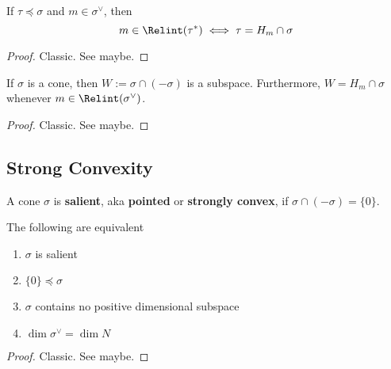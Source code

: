 \begin{lemma}
  \label{1-2-rel-interior-dual-face}

  If $\tau \preceq \sigma$ and $m \in \sigma^\vee$, then
  $$m \in \Relint(\tau^*) \iff \tau = H_m \cap \sigma$$
\end{lemma}
\begin{proof}
  \uses{}

  Classic. See \cite{Oda_1988} maybe.
\end{proof}


\begin{lemma}
  \label{1-2-min-face}

  If $\sigma$ is a cone, then $W := \sigma \cap (-\sigma)$ is a subspace. Furthermore,
  $W = H_m \cap \sigma$ whenever $m \in \Relint(\sigma^\vee)$.
\end{lemma}
\begin{proof}
  \uses{}

  Classic. See \cite{Oda_1988} maybe.
\end{proof}


\subsection{Strong Convexity}


\begin{definition}
  \label{02-salient-cone}
  \uses{}
  \leanok

  A cone $\sigma$ is {\bf salient}, aka {\bf pointed} or {\bf strongly convex}, if $\sigma \cap (-\sigma) = \{0\}$.
\end{definition}


\begin{proposition}
  \label{02-salient-cone-tfae}

  The following are equivalent
  \begin{enumerate}
    \item $\sigma$ is salient
    \item $\{0\} \preceq \sigma$
    \item $\sigma$ contains no positive dimensional subspace
    \item $\dim \sigma^\vee = \dim N$
  \end{enumerate}
\end{proposition}
\begin{proof}
  \uses{}

  Classic. See \cite{Oda_1988} maybe.
\end{proof}


